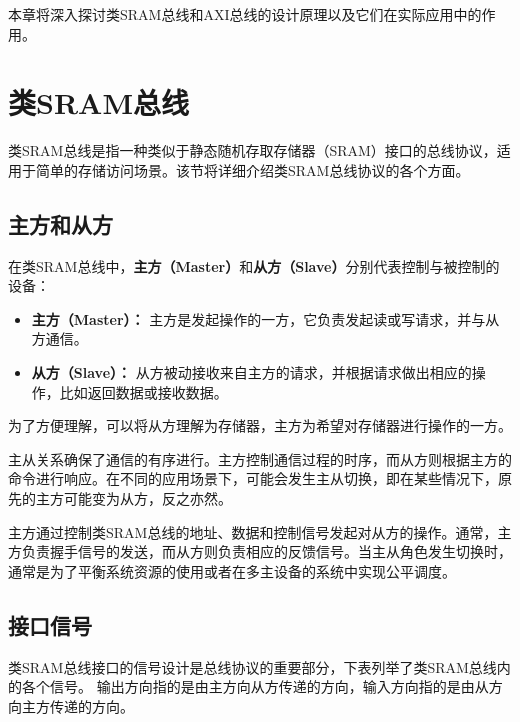 本章将深入探讨类SRAM总线和AXI总线的设计原理以及它们在实际应用中的作用。

\section{类SRAM总线}\label{sec:08-bus-and-soc-002}

类SRAM总线是指一种类似于静态随机存取存储器（SRAM）接口的总线协议，适用于简单的存储访问场景。该节将详细介绍类SRAM总线协议的各个方面。

\subsection{主方和从方}\label{sec:08-bus-and-soc-003}

在类SRAM总线中，\textbf{主方（Master）}和\textbf{从方（Slave）}分别代表控制与被控制的设备：

\begin{itemize}
\tightlist
\item
  \textbf{主方（Master）：} 主方是发起操作的一方，它负责发起读或写请求，并与从方通信。
\item
  \textbf{从方（Slave）：} 从方被动接收来自主方的请求，并根据请求做出相应的操作，比如返回数据或接收数据。
\end{itemize}

为了方便理解，可以将从方理解为存储器，主方为希望对存储器进行操作的一方。

主从关系确保了通信的有序进行。主方控制通信过程的时序，而从方则根据主方的命令进行响应。在不同的应用场景下，可能会发生主从切换，即在某些情况下，原先的主方可能变为从方，反之亦然。

主方通过控制类SRAM总线的地址、数据和控制信号发起对从方的操作。通常，主方负责握手信号的发送，而从方则负责相应的反馈信号。当主从角色发生切换时，通常是为了平衡系统资源的使用或者在多主设备的系统中实现公平调度。

\subsection{接口信号}\label{sec:08-bus-and-soc-004}

类SRAM总线接口的信号设计是总线协议的重要部分，下表列举了类SRAM总线内的各个信号。
输出方向指的是由主方向从方传递的方向，输入方向指的是由从方向主方传递的方向。

